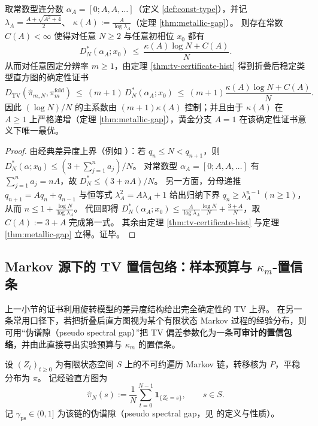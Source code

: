 \begin{corollary}\label{cor:metallic-mean-golden-unique-optimal-tv-constant}
取常数型连分数 \(\alpha_A=[0;A,A,\dots]\)（定义 \ref{def:const-type}），并记
\(\lambda_A=\frac{A+\sqrt{A^2+4}}{2}\)、
\(\kappa(A):=\frac{A}{\log\lambda_A}\)（定理 \ref{thm:metallic-gap}）。
则存在常数 \(C(A)<\infty\) 使得对任意 \(N\ge 2\) 与任意初相位 \(x_0\) 都有
\[
D_N^*(\alpha_A;x_0)\ \le\ \frac{\kappa(A)\log N+C(A)}{N}.
\]
从而对任意固定分辨率 \(m\ge 1\)，由定理 \ref{thm:tv-certificate-hist} 得到折叠后稳定类型直方图的确定性证书
\[
D_{\mathrm{TV}}(\hat{\pi}_{m,N},\pi_m^{\mathrm{fold}})
\ \le\ (m+1)\,D_N^*(\alpha_A;x_0)
\ \le\ (m+1)\frac{\kappa(A)\log N+C(A)}{N}.
\]
因此 \((\log N)/N\) 的主系数由 \((m+1)\kappa(A)\) 控制；并且由于 \(\kappa(A)\) 在 \(A\ge 1\) 上严格递增（定理 \ref{thm:metallic-gap}），黄金分支 \(A=1\) 在该确定性证书意义下唯一最优。
\end{corollary}
\begin{proof}
由经典差异度上界（例如 \cite{KuipersNiederreiter1974}）：若 \(q_n\le N<q_{n+1}\)，则
\(
D_N^*(\alpha;x_0)\le (3+\sum_{j=1}^{n}a_j)/N
\)。
对常数型 \(\alpha_A=[0;A,A,\dots]\) 有 \(\sum_{j=1}^{n}a_j=nA\)，故 \(D_N^*\le (3+nA)/N\)。
另一方面，分母递推 \(q_{n+1}=Aq_n+q_{n-1}\) 与恒等式 \(\lambda_A^2=A\lambda_A+1\) 给出归纳下界 \(q_n\ge \lambda_A^{n-1}\ (n\ge 1)\)，从而
\(
n\le 1+\frac{\log N}{\log\lambda_A}
\)。
代回即得
\(
D_N^*(\alpha_A;x_0)\le \frac{A}{\log\lambda_A}\frac{\log N}{N}+\frac{3+A}{N}
\)，取 \(C(A):=3+A\) 完成第一式。
其余由定理 \ref{thm:tv-certificate-hist} 与定理 \ref{thm:metallic-gap} 立得。证毕。
\end{proof}

\subsection{Markov 源下的 TV 置信包络：样本预算与 \texorpdfstring{$\kappa_m$}{kappa}-置信条}\label{subsec:markov-tv-envelope}
上一小节的证书利用旋转模型的差异度结构给出完全确定性的 TV 上界。
在另一条常用口径下，若把折叠后直方图视为某个有限状态 Markov 过程的经验分布，则可用“伪谱隙（pseudo spectral gap）”把 TV 偏差参数化为一条\textbf{可审计的置信包络}，并由此直接导出实验预算与 \(\kappa_m\) 的置信条。

\begin{definition}[伪谱隙与经验直方图]\label{def:markov-pseudo-gap-hist}
设 \((Z_t)_{t\ge 0}\) 为有限状态空间 \(S\) 上的不可约遍历 Markov 链，转移核为 \(P\)，平稳分布为 \(\pi\)。
记经验直方图为
\[
\hat{\pi}_N(s):=\frac{1}{N}\sum_{t=0}^{N-1}\mathbf{1}_{\{Z_t=s\}},\qquad s\in S.
\]
记 \(\gamma_{\mathrm{ps}}\in(0,1]\) 为该链的伪谱隙（pseudo spectral gap，见 \cite{Paulin2015MarkovConcentration} 的定义与性质）。
\end{definition}

